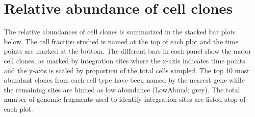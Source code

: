 \documentclass[]{article}
\begin{document}
\begin{table}[H]
\centering
{}
\end{table}

\hypertarget{relative-abundance-of-cell-clones}{%
\section{Relative abundance of cell
clones}\label{relative-abundance-of-cell-clones}}

The relative abundances of cell clones is summarized in the stacked bar
plots below. The cell fraction studied is named at the top of each plot
and the time points are marked at the bottom. The different bars in each
panel show the major cell clones, as marked by integration sites where
the x-axis indicates time points and the y-axis is scaled by proportion
of the total cells sampled. The top 10 most abundant clones from each
cell type have been named by the nearest gene while the remaining sites
are binned as low abundance (LowAbund; grey). The total number of
genomic fragments used to identify integration sites are listed atop of
each plot.
\end{document}
